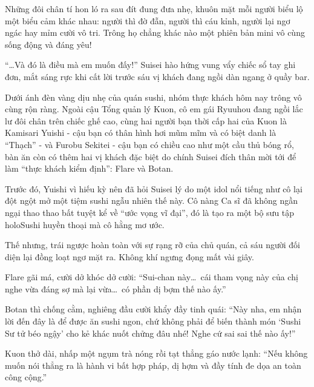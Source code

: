 \documentclass[../main.tex]{subfiles}
\begin{document}

Những đôi chân tí hon ló ra sau đít đung đưa nhẹ, khuôn mặt mỗi người biểu lộ một biểu cảm khác nhau: người thì đờ đẫn, người thì cáu kỉnh, người lại ngơ ngác hay mỉm cười vô tri. Trông họ chẳng khác nào một phiên bản mini vô cùng sống động và đáng yêu!

\omk

``\dots Và đó là điều mà em muốn đấy!'' Suisei hào hứng vung vẩy chiếc sổ tay ghi đơn, mắt sáng rực khi cất lời trước sáu vị khách đang ngồi dàn ngang ở quầy bar.

Dưới ánh đèn vàng dịu nhẹ của quán sushi, nhóm thực khách hôm nay trông vô cùng rộn ràng. Ngoài cậu Tổng quản lý Kuon, cô em gái Ryuuhou đang ngồi lắc lư đôi chân trên chiếc ghế cao, cùng hai người bạn thời cấp hai của Kuon là Kamisari Yuishi - cậu bạn có thân hình hơi mũm mĩm và có biệt danh là ``Thạch'' - và Furobu Sekitei - cậu bạn có chiều cao như một cầu thủ bóng rổ, bàn ăn còn có thêm hai vị khách đặc biệt do chính Suisei đích thân mời tới để làm ``thực khách kiểm định'':  Flare và Botan.

Trước đó, Yuishi vì hiếu kỳ nên đã hỏi Suisei lý do một idol nổi tiếng như cô lại đột ngột mở một tiệm sushi ngẫu nhiên thế này. Cô nàng Ca sĩ đã không ngần ngại thao thao bất tuyệt kể về ``ước vọng vĩ đại'', đó là tạo ra một bộ sưu tập holoSushi huyền thoại mà cô hằng mơ ước.

Thế nhưng, trái ngược hoàn toàn với sự rạng rỡ của chủ quán, cả sáu người đối diện lại đồng loạt ngơ mặt ra. Không khí ngưng đọng mất vài giây.

Flare gãi má, cười dở khóc dở cười: ``Sui-chan này\dots\ cái tham vọng này của chị nghe vừa đáng sợ mà lại vừa\dots\ có phần dị bợm thế nào ấy.''

Botan thì chống cằm, nghiêng đầu cười khẩy đầy tinh quái: ``Này nha, em nhận lời đến đây là để được ăn sushi ngon, chứ không phải để biến thành món `Sushi Sư tử béo ngậy' cho kẻ khác nuốt chửng đâu nhé! Nghe cứ sai sai thế nào ấy!''

Kuon thở dài, nhấp một ngụm trà nóng rồi tạt thẳng gáo nước lạnh: ``Nếu không muốn nói thẳng ra là hành vi bất hợp pháp, dị hợm và đầy tính đe dọa an toàn công cộng.''
\end{document}
